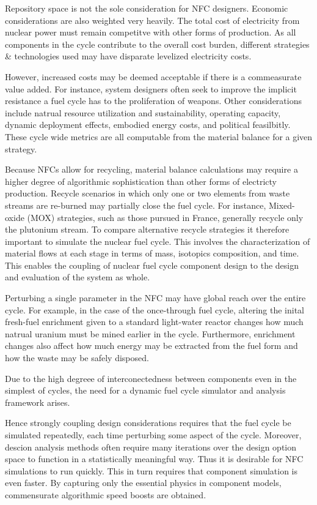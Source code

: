 Repository space is not the sole consideration for NFC designers.  Economic considerations 
are also weighted very heavily.  The total cost of electricity from nuclear power must remain competitve 
with other forms of production.  As all components in the cycle contribute to the overall cost burden, 
different strategies \& technologies used may have disparate levelized electricity costs.

However, increased costs may be deemed acceptable if there is a commeasurate value added.
For instance, system designers often seek to improve the implicit resistance a fuel cycle 
has to the proliferation of weapons.  Other considerations include natrual resource 
utilization and sustainability, operating capacity, dynamic deployment effects,
embodied energy costs, and political feasilbitly.  These cycle wide metrics are all computable 
from the material balance for a given strategy. 

Because NFCs allow for recycling, material balance calculations may require a higher degree of
algorithmic sophistication than other forms of electricty production.  
Recycle scenarios in which only one or two 
elements from waste streams are re-burned may partially close the fuel cycle.  
For instance, Mixed-oxide (MOX) strategies, such as those pursued in France, 
generally recycle only the plutonium stream.  
To compare alternative recycle strategies it therefore important to simulate the nuclear fuel cycle.  
This involves the characterization 
of material flows at each stage in terms of mass, isotopics composition, and time.  This enables 
the coupling of nuclear fuel cycle component design to the design and evaluation of the system as whole.  

Perturbing a single parameter in the NFC may have global reach over the entire cycle.
For example, in the case of the once-through fuel cycle, altering the inital fresh-fuel 
 enrichment given to a standard light-water reactor changes how much natrual 
uranium must be mined earlier in the cycle.  Furthermore, enrichment changes also affect 
how much energy may be extracted from the fuel form and how the waste may be safely disposed.

Due to the high degreee of interconectedness between components 
even in the simplest of cycles, the need for a dynamic 
fuel cycle simulator and analysis framework arises.

Hence strongly coupling design considerations requires that the fuel cycle be simulated repeatedly, each 
time perturbing some aspect of the cycle.  
Moreover, descion analysis methods often require many iterations over the design option space
to function in a statistically meaningful way.
Thus it is desirable for
NFC simulations to run quickly.  This in turn requires that component simulation is even faster. 
By capturing only the essential physics in component models, commensurate algorithmic speed 
boosts are obtained.

